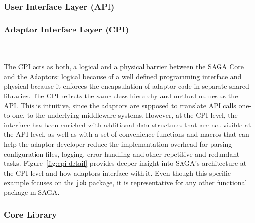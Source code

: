   


  \subsubsection{User Interface Layer (API)}
 
 
  \subsubsection{Adaptor Interface Layer (CPI)}
  \\
  \\
  The CPI acts as both,
  a logical and a physical barrier between the SAGA Core and the Adaptors:
  logical because of a well defined programming interface and physical because
  it enforces the encapsulation of adaptor code in separate shared libraries.
  The CPI reflects the same class hierarchy and method names as the API. This
  is intuitive, since the adaptors are supposed to translate API calls
  one-to-one, to the underlying middleware systems. However, at the CPI level,
  the interface has been enriched with additional data structures that are not
  visible at the API level, as well as with a set of convenience functions and
  macros that can help the adaptor developer reduce the implementation overhead
  for parsing configuration files, logging, error handling and other repetitive
  and redundant tasks. Figure~\ref{fig:cpi-detail} provides deeper insight into
  SAGA's architecture at the CPI level and how adaptors interface with it. Even
  though this specific example focuses on the \texttt{job} package, it is
  representative for any other functional package in SAGA.
 
 
  \subsubsection{Core Library}


